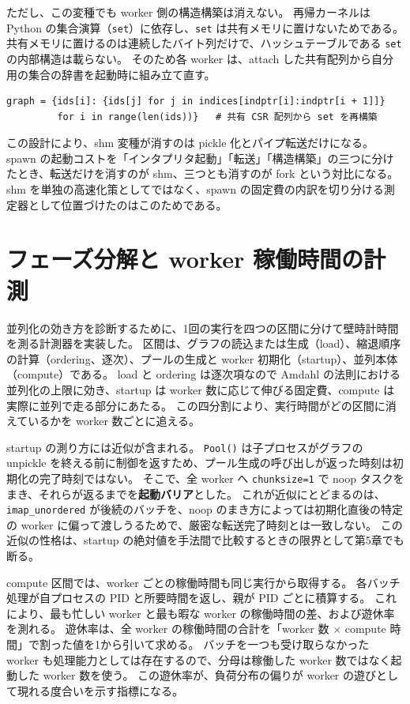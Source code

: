 ただし、この変種でも worker 側の構造構築は消えない。
再帰カーネルは Python の集合演算（\verb|set|）に依存し、\verb|set| は共有メモリに置けないためである。
共有メモリに置けるのは連続したバイト列だけで、ハッシュテーブルである \verb|set| の内部構造は載らない。
そのため各 worker は、attach した共有配列から自分用の集合の辞書を起動時に組み立て直す。

\begin{verbatim}
graph = {ids[i]: {ids[j] for j in indices[indptr[i]:indptr[i + 1]]}
         for i in range(len(ids))}   # 共有 CSR 配列から set を再構築
\end{verbatim}

この設計により、shm 変種が消すのは pickle 化とパイプ転送だけになる。
spawn の起動コストを「インタプリタ起動」「転送」「構造構築」の三つに分けたとき、転送だけを消すのが shm、三つとも消すのが fork という対比になる。
shm を単独の高速化策としてではなく、spawn の固定費の内訳を切り分ける測定器として位置づけたのはこのためである。

\section{フェーズ分解と worker 稼働時間の計測}

並列化の効き方を診断するために、1回の実行を四つの区間に分けて壁時計時間を測る計測器を実装した。
区間は、グラフの読込または生成（load）、縮退順序の計算（ordering、逐次）、プールの生成と worker 初期化（startup）、並列本体（compute）である。
load と ordering は逐次項なので Amdahl の法則における並列化の上限に効き、startup は worker 数に応じて伸びる固定費、compute は実際に並列で走る部分にあたる。
この四分割により、実行時間がどの区間に消えているかを worker 数ごとに追える。

startup の測り方には近似が含まれる。
\verb|Pool()| は子プロセスがグラフの unpickle を終える前に制御を返すため、プール生成の呼び出しが返った時刻は初期化の完了時刻ではない。
そこで、全 worker へ \verb|chunksize=1| で noop タスクをまき、それらが返るまでを\textbf{起動バリア}とした。
これが近似にとどまるのは、\verb|imap_unordered| が後続のバッチを、noop のまき方によっては初期化直後の特定の worker に偏って渡しうるためで、厳密な転送完了時刻とは一致しない。
この近似の性格は、startup の絶対値を手法間で比較するときの限界として第5章でも断る。

compute 区間では、worker ごとの稼働時間も同じ実行から取得する。
各バッチ処理が自プロセスの PID と所要時間を返し、親が PID ごとに積算する。
これにより、最も忙しい worker と最も暇な worker の稼働時間の差、および遊休率を測れる。
遊休率は、全 worker の稼働時間の合計を「worker 数 $\times$ compute 時間」で割った値を1から引いて求める。
バッチを一つも受け取らなかった worker も処理能力としては存在するので、分母は稼働した worker 数ではなく起動した worker 数を使う。
この遊休率が、負荷分布の偏りが worker の遊びとして現れる度合いを示す指標になる。

